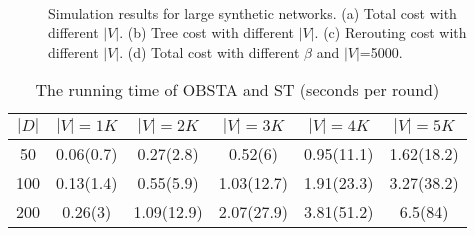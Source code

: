 \documentclass[10pt, conference, letterpaper]{IEEEtran}
\theoremstyle{definition}
\begin{document}
\begin{figure}[t!]
\centering
{}
\\ \vspace{-4mm}
\caption{Simulation results for large synthetic networks. (a) Total cost with different $|V|$. (b) Tree cost with different $|V|$. (c) Rerouting cost with different $|V|$. (d) Total cost with different $\beta$ and $|V|$=5000.}
\label{f:large_topo}
\end{figure}




\begin{table}[t!]
\caption{The running time of OBSTA and ST (seconds per round)}
\begin{center}
\begin{tabular}{cccccc}
\hline
 $|D|$ & $|V|=1K$ & $|V|=2K$ & $|V|=3K$ & $|V|=4K$ & $|V|=5K$ \\ \hline
50 & 0.06(0.7) & 0.27(2.8) & 0.52(6) & 0.95(11.1) & 1.62(18.2) \\ \hline
100 & 0.13(1.4) & 0.55(5.9) & 1.03(12.7) & 1.91(23.3) & 3.27(38.2) \\ \hline
200 & 0.26(3) & 1.09(12.9) & 2.07(27.9) & 3.81(51.2) & 6.5(84) \\
\hline
\end{tabular}
\label{t:running_time}
\end{center}
\par
\end{table}
\end{document}
